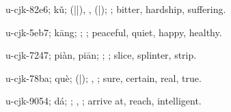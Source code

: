 \begin{multicols}{2}
{\cjkgGlue{}u-cjk-82e6; kǔ; \cjkgGlue{}\cjkgGlue{}(\cjkgGlue{}|\cjkgGlue{}|\cjkgGlue{}), \cjkgGlue{}\cjkgGlue{}\cjkgGlue{}, \cjkgGlue{}\cjkgGlue{}(\cjkgGlue{}|\cjkgGlue{}); \cjkgGlue{}; bitter, hardship, suffering.

\cjkgGlue{}u-cjk-5eb7; kāng; \cjkgGlue{}; \cjkgGlue{}; peaceful, quiet, happy, healthy.

\cjkgGlue{}u-cjk-7247; piàn, piān; \cjkgGlue{}; \cjkgGlue{}; slice, splinter, strip.

\cjkgGlue{}u-cjk-78ba; què; \cjkgGlue{}\cjkgGlue{}(\cjkgGlue{}|\cjkgGlue{}); \cjkgGlue{}, \cjkgGlue{}; sure, certain, real, true.

\cjkgGlue{}u-cjk-9054; dá; \cjkgGlue{}; \cjkgGlue{}, \cjkgGlue{}; arrive at, reach, intelligent.

}
\end{multicols}
